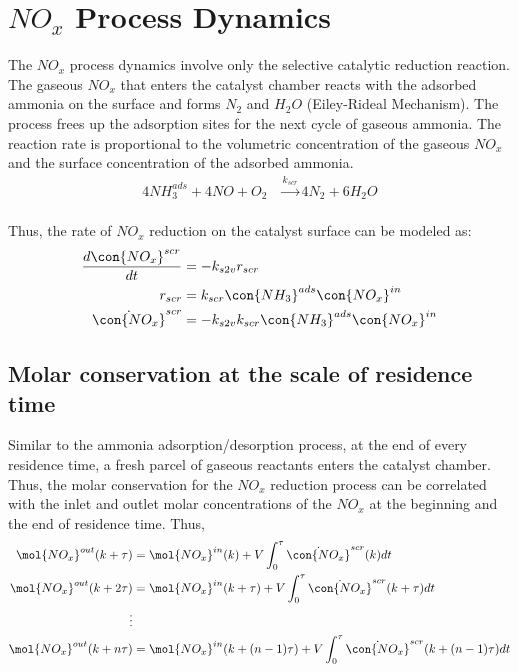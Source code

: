 \newpage
\section{$NO_x$ Process Dynamics}

The $NO_x$ process dynamics involve only the selective catalytic reduction reaction. The gaseous $NO_x$ that enters the
catalyst chamber reacts with the adsorbed ammonia on the surface and forms $N_2$ and $H_2O$ (Eiley-Rideal Mechanism).
The process frees up the adsorption sites for the next cycle of gaseous ammonia. The reaction rate is proportional to
the volumetric concentration of the gaseous $NO_x$ and the surface concentration of the adsorbed ammonia.
\begin{align}
    4 NH_3 ^{ads} + 4 NO + O_2 &\xrightarrow[]{k_{scr}} 4 N_2 + 6 H_2O
\end{align}

Thus, the rate of $NO_x$ reduction on the catalyst surface can be modeled as:
\begin{align}
    \frac{d \con{NO_x}^{scr}}{dt} &= - k_{s2v} r_{scr} \\
    r_{scr} &= k_{scr} \con{NH_3}^{ads} \con{NO_x}^{in}\\
    \dot{\con{NO_x}}^{scr} &= -k_{s2v} k_{scr} \con{NH_3}^{ads} \con{NO_x}^{in}
\end{align}

\subsection{Molar conservation at the scale of residence time}

Similar to the ammonia adsorption/desorption process, at the end of every residence time, a fresh parcel of gaseous
reactants enters the catalyst chamber. Thus, the molar conservation for the $NO_x$ reduction process can be
correlated with the inlet and outlet molar concentrations of the $NO_x$ at the beginning and the end of residence time. Thus,
\begin{align*}
    \mol{NO_x}^{out} (k + \tau) &= \mol{NO_x}^{in} (k) + V \int_{0}^{\tau}  \dot{\con{NO_x}}^{scr} (k) dt\\
    \mol{NO_x}^{out} (k + 2\tau) &= \mol{NO_x}^{in} (k + \tau) + V \int_{0}^{\tau} \dot{\con{NO_x}}^{scr} (k+\tau)  dt\\
    \vdots &\\
    \mol{NO_x}^{out} (k + n\tau) &= \mol{NO_x}^{in} (k + (n-1)\tau) + V \int_{0}^{\tau} \dot{\con{NO_x}}^{scr} (k+(n-1)\tau) dt
\end{align*}

